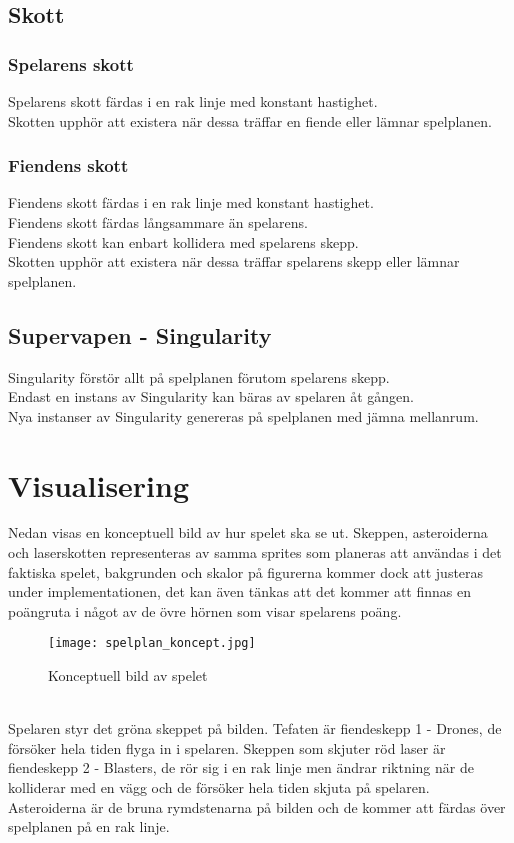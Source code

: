 \documentclass{TDP003mall}
\begin{document}
\subsection{Skott}
\subsubsection{Spelarens skott}
Spelarens skott färdas i en rak linje med konstant hastighet. \\
Skotten upphör att existera när dessa träffar en fiende eller lämnar spelplanen. \\

\subsubsection{Fiendens skott}
Fiendens skott färdas i en rak linje med konstant hastighet. \\
Fiendens skott färdas långsammare än spelarens. \\
Fiendens skott kan enbart kollidera med spelarens skepp. \\
Skotten upphör att existera när dessa träffar spelarens skepp eller lämnar spelplanen. \\

\subsection{Supervapen - Singularity}
Singularity förstör allt på spelplanen förutom spelarens skepp. \\
Endast en instans av Singularity kan bäras av spelaren åt gången. \\
Nya instanser av Singularity genereras på spelplanen med jämna mellanrum. \\

\newpage

\section{Visualisering}
Nedan visas en konceptuell bild av hur spelet ska se ut. Skeppen, asteroiderna och laserskotten representeras av samma sprites som planeras att användas i det faktiska spelet, bakgrunden och skalor på figurerna kommer dock att justeras under implementationen, det kan även tänkas att det kommer att finnas en poängruta i något av de övre hörnen som visar spelarens poäng.
\begin{figure}[!h]
\texttt{[image: spelplan\_koncept.jpg]}
\caption{Konceptuell bild av spelet} 
\end{figure}
\\Spelaren styr det gröna skeppet på bilden. 
Tefaten är fiendeskepp 1 - Drones, de försöker hela tiden flyga in i spelaren. 
Skeppen som skjuter röd laser är fiendeskepp 2 - Blasters, de rör sig i en rak linje men ändrar riktning när de kolliderar med en vägg och de försöker hela tiden skjuta på spelaren. 
Asteroiderna är de bruna rymdstenarna på bilden och de kommer att färdas över spelplanen på en rak linje.
\end{document}
